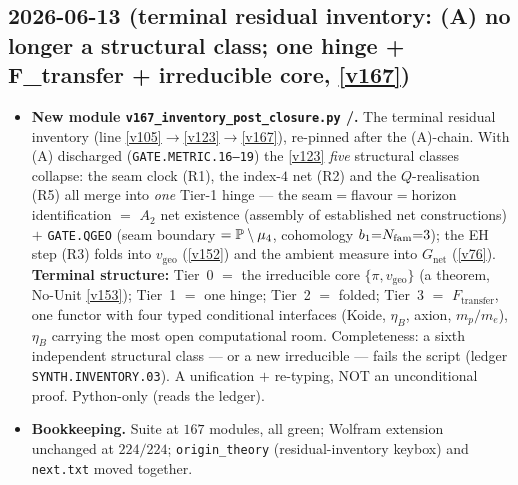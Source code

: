 \subsection*{2026-06-13 (terminal residual inventory: (A) no longer a structural class; one hinge + F\_transfer + irreducible core, \vref{v167})}
\begin{itemize}
\item \textbf{New module \texttt{v167\_inventory\_post\_closure.py} \mE/\mC.} The terminal residual
  inventory (line \vref{v105}$\to$\vref{v123}$\to$\vref{v167}), re-pinned after the (A)-chain. With (A)
  discharged (\texttt{GATE.METRIC.16--19}) the \vref{v123} \emph{five} structural classes collapse: the
  seam clock (R1), the index-$4$ net (R2) and the $Q$-realisation (R5) all merge into \emph{one} Tier-1
  hinge --- the seam$=$flavour$=$horizon identification $=$ $A_2$ net existence (assembly of established
  net constructions) $+$ \texttt{GATE.QGEO} (seam boundary $=\mathbb{P}\setminus\mu_4$, cohomology
  $b_1{=}N_{\mathrm{fam}}{=}3$); the EH step (R3) folds into $v_{\mathrm{geo}}$ (\vref{v152}) and the ambient measure
  into $G_{\mathrm{net}}$ (\vref{v76}). \textbf{Terminal structure:} Tier~0 $=$ the irreducible core
  $\{\pi,v_{\mathrm{geo}}\}$ (a theorem, No-Unit \vref{v153}); Tier~1 $=$ one hinge; Tier~2 $=$ folded;
  Tier~3 $=$ $F_{\mathrm{transfer}}$, one functor with four typed conditional interfaces (Koide, $\eta_B$,
  axion, $m_p/m_e$), $\eta_B$ carrying the most open computational room. Completeness: a sixth independent
  structural class --- or a new irreducible --- fails the script (ledger \texttt{SYNTH.INVENTORY.03}). A
  unification $+$ re-typing, NOT an unconditional proof. Python-only (reads the ledger).
\item \textbf{Bookkeeping.} Suite at $167$ modules, all green; Wolfram extension unchanged at $224/224$;
  \texttt{origin\_theory} (residual-inventory keybox) and \texttt{next.txt} moved together.
\end{itemize}

